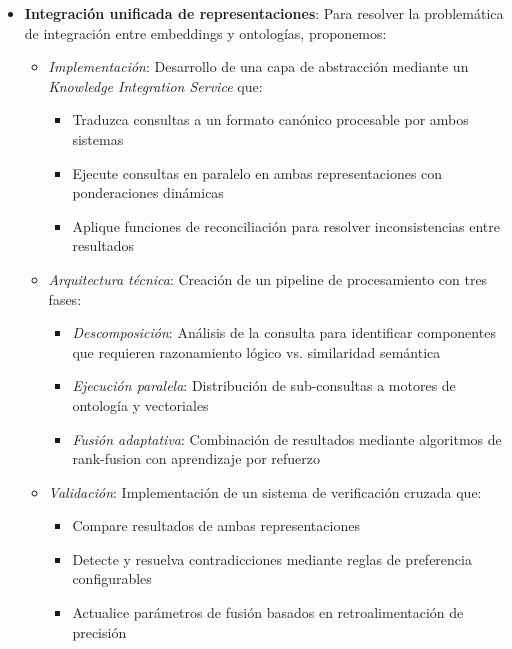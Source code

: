 \documentclass[runningheads]{llncs}
\begin{document}
\begin{itemize}
  \item \textbf{Integración unificada de representaciones}: Para resolver la problemática de integración entre embeddings y ontologías, proponemos:
  \begin{itemize}
    \item \textit{Implementación}: Desarrollo de una capa de abstracción mediante un \textit{Knowledge Integration Service} que:
    \begin{itemize}
      \item Traduzca consultas a un formato canónico procesable por ambos sistemas
      \item Ejecute consultas en paralelo en ambas representaciones con ponderaciones dinámicas
      \item Aplique funciones de reconciliación para resolver inconsistencias entre resultados
    \end{itemize}
    
    \item \textit{Arquitectura técnica}: Creación de un pipeline de procesamiento con tres fases:
    \begin{itemize}
      \item \textit{Descomposición}: Análisis de la consulta para identificar componentes que requieren razonamiento lógico vs. similaridad semántica
      \item \textit{Ejecución paralela}: Distribución de sub-consultas a motores de ontología y vectoriales
      \item \textit{Fusión adaptativa}: Combinación de resultados mediante algoritmos de rank-fusion con aprendizaje por refuerzo
    \end{itemize}
    
    \item \textit{Validación}: Implementación de un sistema de verificación cruzada que:
    \begin{itemize}
      \item Compare resultados de ambas representaciones
      \item Detecte y resuelva contradicciones mediante reglas de preferencia configurables
      \item Actualice parámetros de fusión basados en retroalimentación de precisión
    \end{itemize}
  \end{itemize}
  

\end{itemize}
\end{document}
